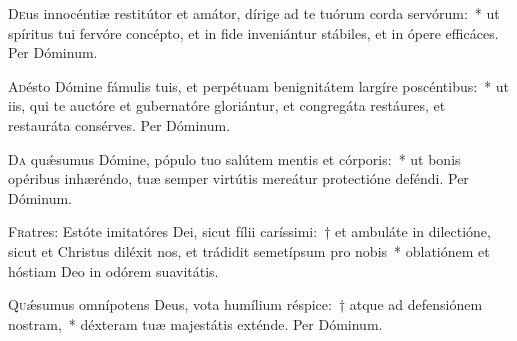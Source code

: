 \documentclass[vesperale_romanum.tex]{subfiles}
\begin{document}
\oratio

\lettrine{D}{e}us innocéntiæ restitútor et amátor, dírige ad te tuórum corda servórum:~* ut spíritus tui fervóre concépto, et in fide inveniántur stábiles, et in ópere efficáces. Per Dóminum.



\oratio

\lettrine{A}{d}ésto Dómine fámulis tuis, et perpétuam benignitátem largíre poscéntibus:~* ut iis, qui te auctóre et gubernatóre gloriántur, et congregáta restáures, et restauráta consérves. Per Dóminum.



\oratio

\lettrine{D}{a} quǽsumus Dómine, pópulo tuo salútem mentis et córporis:~* ut bonis opéribus inhæréndo, tuæ semper virtútis mereátur prote\-ctióne deféndi. Per Dóminum.



\lettrine{F}{r}atres: Estóte imitatóres Dei, sicut fílii caríssimi:~† et ambuláte in dilectióne, sicut et Christus diléxit nos, et trádidit semetípsum pro nobis~* oblatiónem et hóstiam Deo in odórem suavitátis.



\oratio

\lettrine{Q}{u}ǽsumus omnípotens Deus, vota humílium réspice:~† atque ad defensiónem nostram,~* déxteram tuæ majestátis exténde.
Per Dóminum.





\end{document}
